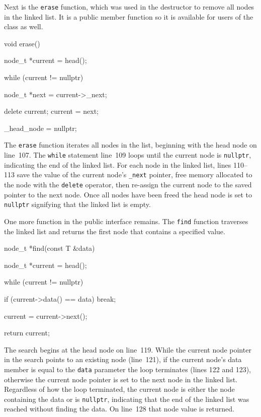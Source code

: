\documentclass{article}
\begin{document}
  Next is the \verb|erase| function, which was used in the destructor to remove all nodes in the linked list. It is a public member function so it is available for users of the class as well.
  \begin{lstcpp}
  void erase() {
    node_t *current = head();

    while (current != nullptr) {
      node_t *next = current->_next;

      delete current;
      current = next;
    }

    _head_node = nullptr;
  }\end{lstcpp}
  The \verb|erase| function iterates all nodes in the list, beginning with the head node on line~107. The \verb|while| statement line~109 loops until the current node is \verb|nullptr|, indicating the end of the linked list. For each node in the linked list, lines 110--113 save the value of the current node's \verb|_next| pointer, free memory allocated to the node with the \verb|delete| operator, then re-assign the current node to the saved pointer to the next node. Once all nodes have been freed the head node is set to \verb|nullptr| signifying that the linked list is empty.

  One more function in the public interface remains. The \verb|find| function traverses the linked list and returns the first node that contains a specified value.
  \begin{lstcpp}
  node_t *find(const T &data) {
    node_t *current = head();

    while (current != nullptr) {
      if (current->data() == data)
        break;

      current = current->next();
    }

    return current;
  }\end{lstcpp}
  The search begins at the head node on line~119. While the current node pointer in the search points to an existing node (line~121), if the current node's data member is equal to the \verb|data| parameter the loop terminates (lines 122 and 123), otherwise the current node pointer is set to the next node in the linked list. Regardless of how the loop terminated, the current node is either the node containing the data or is \verb|nullptr|, indicating that the end of the linked list was reached without finding the data. On line~128 that node value is returned.
\end{document}
